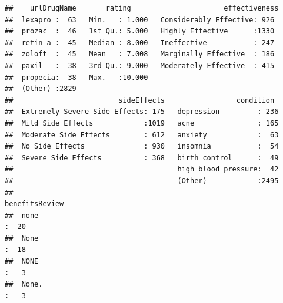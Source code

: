 \documentclass[spanish,]{article}
\begin{document}
\begin{verbatim}
##    urlDrugName       rating                      effectiveness 
##  lexapro :  63   Min.   : 1.000   Considerably Effective: 926  
##  prozac  :  46   1st Qu.: 5.000   Highly Effective      :1330  
##  retin-a :  45   Median : 8.000   Ineffective           : 247  
##  zoloft  :  45   Mean   : 7.008   Marginally Effective  : 186  
##  paxil   :  38   3rd Qu.: 9.000   Moderately Effective  : 415  
##  propecia:  38   Max.   :10.000                                
##  (Other) :2829                                                 
##                         sideEffects                 condition   
##  Extremely Severe Side Effects: 175   depression         : 236  
##  Mild Side Effects            :1019   acne               : 165  
##  Moderate Side Effects        : 612   anxiety            :  63  
##  No Side Effects              : 930   insomnia           :  54  
##  Severe Side Effects          : 368   birth control      :  49  
##                                       high blood pressure:  42  
##                                       (Other)            :2495  
##                                                                                                                                                                                                                                                                                                                          benefitsReview
##  none                                                                                                                                                                                                                                                                                                                           :  20  
##  None                                                                                                                                                                                                                                                                                                                           :  18  
##  NONE                                                                                                                                                                                                                                                                                                                           :   3  
##  None.                                                                                                                                                                                                                                                                                                                          :   3  

\end{verbatim}
\end{document}
